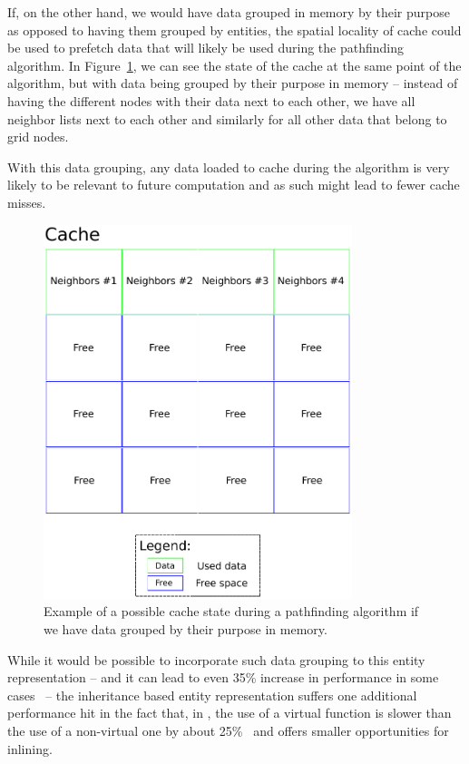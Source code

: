 If, on the other hand, we would have data grouped in memory by their purpose as opposed to having them grouped by entities, the spatial
locality of cache could be used to prefetch data that will likely be used during the pathfinding algorithm. In Figure~\ref{cache-dd},
we can see the state of the cache at the same point of the algorithm, but with data being grouped by their purpose in memory
-- instead of having the different nodes with their data next to each other, we have all neighbor lists next to each other and
similarly for all other data that belong to grid nodes.

With this data grouping, any data loaded to cache during the algorithm is very likely to be relevant to future computation and as
such might lead to fewer cache misses.

\begin{figure}[H]
    \centering
    \includegraphics[width=9cm]{../img/grid-cache-data-driven.pdf}
    \caption{Example of a possible cache state during a pathfinding algorithm if we have data grouped by their purpose in memory.}
    \label{cache-dd}
\end{figure}

While it would be possible to incorporate such data grouping to this entity representation -- and it can lead to even 35\% increase
in performance in some cases~\cite{OOPPitfalls} -- the inheritance based entity representation suffers one additional performance
hit in the fact that, in \cpp, the use of a virtual function is slower than the use of a non-virtual one by about 25\%~\cite{CppProgLang} and
offers smaller opportunities for inlining.

